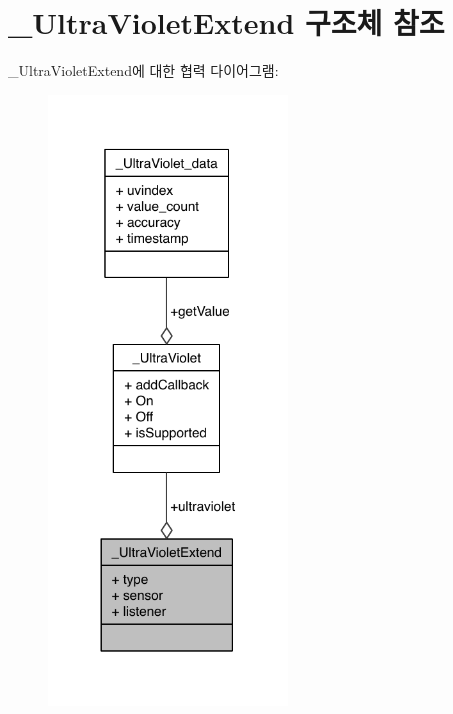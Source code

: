 \hypertarget{struct___ultra_violet_extend}{\section{\-\_\-\-Ultra\-Violet\-Extend 구조체 참조}
\label{struct___ultra_violet_extend}
}


\-\_\-\-Ultra\-Violet\-Extend에 대한 협력 다이어그램\-:\nopagebreak
\begin{figure}[H]
\begin{center}
\leavevmode
\includegraphics[width=180pt]{dc/d5e/struct___ultra_violet_extend__coll__graph}
\end{center}
\end{figure}
